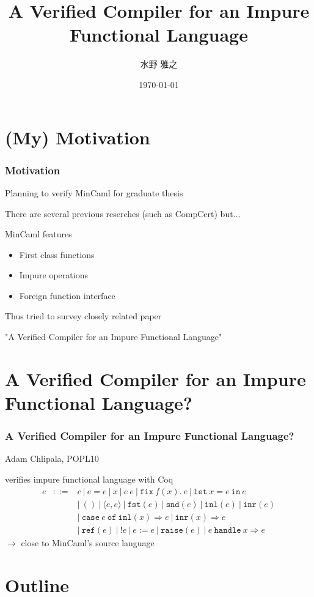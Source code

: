 \documentclass[dvipdfmx,cjk,xcolor=dvipsnames,envcountsect,notheorems,aspectratio=169]{beamer}
\title{A Verified Compiler for an Impure Functional Language}
\author{水野 雅之}
\date{\today}
\theoremstyle{definition}
\newcommand{\FIX}{\texttt{fix}}
\newcommand{\LET}{\texttt{let}}
\newcommand{\IN}{\texttt{in}}
\newcommand{\FST}{\texttt{fst}}
\newcommand{\SND}{\texttt{snd}}
\newcommand{\INL}{\texttt{inl}}
\newcommand{\INR}{\texttt{inr}}
\newcommand{\CASE}{\texttt{case}}
\newcommand{\OF}{\texttt{of}}
\newcommand{\REF}{\texttt{ref}}
\newcommand{\RAISE}{\texttt{raise}}
\newcommand{\HANDLE}{\texttt{handle}}
\begin{document}
\frame[plain]{\titlepage}

\section*{(My) Motivation}

\begin{frame}
  \frametitle{Motivation}
	\LARGE Planning to verify MinCaml for graduate thesis

	There are several previous reserches (such as CompCert) but...

	\vfill

	MinCaml features
	\begin{itemize}
		\item First class functions
		\item Impure operations
		\item Foreign function interface
	\end{itemize}
	
	\vfill

	Thus tried to survey closely related paper

	"A Verified Compiler for an Impure Functional Language"
\end{frame}

\section*{A Verified Compiler for an Impure Functional Language?}

\begin{frame}
  \frametitle{A Verified Compiler for an Impure Functional Language?}
	\LARGE Adam Chlipala, POPL10

	\vfill

	verifies impure functional language with Coq
	{\Large \[
		\begin{array}{lcl}
			e & ::= & c~|~e=e~|~x~|~e~e~|~\FIX~f(x).~e~|~\LET~x=e~\IN~e \\
				&     & |~()~|~\langle e,e\rangle~|~\FST(e)~|~\SND(e)~|~\INL(e)~|~\INR(e) \\
				&     & |~\CASE~e~\OF~\INL(x)\Rightarrow e~|~\INR(x)\Rightarrow e \\
				&     & |~\REF(e)~|~!e~|~e := e~|~\RAISE(e)~|~e~\HANDLE~x\Rightarrow e
		\end{array}
	\]}
	$\rightarrow$ close to MinCaml's source language
\end{frame}

\section*{Outline}
\end{document}
